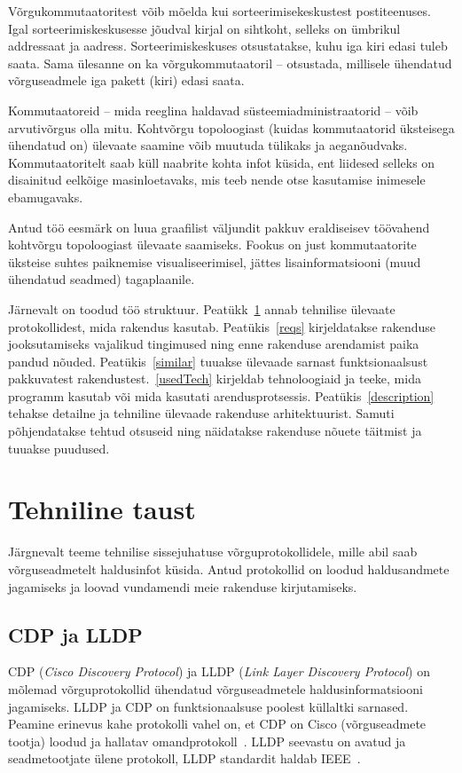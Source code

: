 \documentclass[12pt]{article}
\begin{document}
Võrgukommutaatoritest võib mõelda kui sorteerimisekeskustest postiteenuses.
Igal sorteerimiskeskusesse jõudval kirjal on sihtkoht, selleks on ümbrikul addressaat ja aadress.
Sorteerimiskeskuses otsustatakse, kuhu iga kiri edasi tuleb saata.
Sama ülesanne on ka võrgukommutaatoril -- otsustada, millisele ühendatud võrguseadmele iga pakett
(kiri) edasi saata.

Kommutaatoreid -- mida reeglina haldavad süsteemiadministraatorid -- võib arvutivõrgus olla mitu.
Kohtvõrgu topoloogiast (kuidas kommutaatorid üksteisega ühendatud on) ülevaate saamine võib
muutuda tülikaks ja aeganõudvaks.
Kommutaatoritelt saab küll naabrite kohta infot küsida, ent liidesed selleks on disainitud eelkõige
masinloetavaks, mis teeb nende otse kasutamise inimesele ebamugavaks.

Antud töö eesmärk on luua graafilist väljundit pakkuv eraldiseisev töövahend kohtvõrgu
topoloogiast ülevaate saamiseks.
Fookus on just kommutaatorite üksteise suhtes paiknemise visualiseerimisel, jättes
lisainformatsiooni (muud ühendatud seadmed) tagaplaanile.

Järnevalt on toodud töö struktuur.
Peatükk~\ref{sec:techintro} annab tehnilise ülevaate protokollidest, mida rakendus kasutab.
Peatükis~\ref{reqs} kirjeldatakse rakenduse jooksutamiseks vajalikud tingimused
ning enne rakenduse arendamist paika pandud nõuded.
Peatükis~\ref{similar} tuuakse ülevaade sarnast funktsionaalsust pakkuvatest
rakendustest.~\ref{usedTech} kirjeldab tehnoloogiaid ja teeke, mida programm kasutab või mida
kasutati arendusprotsessis.
Peatükis~\ref{description} tehakse detailne ja tehniline ülevaade rakenduse arhitektuurist.
Samuti põhjendatakse tehtud otsuseid ning näidatakse rakenduse nõuete täitmist ja tuuakse puudused.

\newpage
\section{Tehniline taust} \label{sec:techintro}
Järgnevalt teeme tehnilise sissejuhatuse võrguprotokollidele, mille abil saab võrguseadmetelt
haldusinfot küsida.
Antud protokollid on loodud haldusandmete jagamiseks ja loovad vundamendi meie rakenduse
kirjutamiseks.


\subsection{CDP ja LLDP}
CDP (\textit{Cisco Discovery Protocol}) ja LLDP (\textit{Link Layer Discovery Protocol}) on
mõlemad võrguprotokollid ühendatud võrguseadmetele haldusinformatsiooni jagamiseks.
LLDP ja CDP on funktsionaalsuse poolest küllaltki sarnased.
Peamine erinevus kahe protokolli vahel on, et CDP on Cisco (võrguseadmete tootja)
loodud ja hallatav omandprotokoll~\cite{cdpInfo}.
LLDP seevastu on avatud ja seadmetootjate ülene protokoll, LLDP standardit haldab
IEEE~\cite{lldpInfo}.
\end{document}
